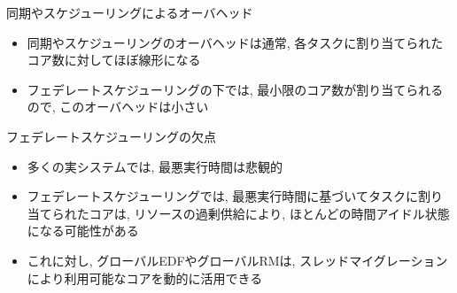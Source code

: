 \begin{frame}{同期やスケジューリングによるオーバヘッド}
    \begin{itemize}
        \item 同期やスケジューリングのオーバヘッドは通常, 各タスクに割り当てられたコア数に対してほぼ線形になる
        \item フェデレートスケジューリングの下では, 最小限のコア数が割り当てられるので, このオーバヘッドは小さい
    \end{itemize}
\end{frame}

\begin{frame}{フェデレートスケジューリングの欠点}
    \begin{itemize}
        \item 多くの実システムでは, 最悪実行時間は悲観的
        \item フェデレートスケジューリングでは, 最悪実行時間に基づいてタスクに割り当てられたコアは, リソースの過剰供給により, ほとんどの時間アイドル状態になる可能性がある
        \item これに対し, グローバルEDFやグローバルRMは, スレッドマイグレーションにより利用可能なコアを動的に活用できる
    \end{itemize}
\end{frame}
